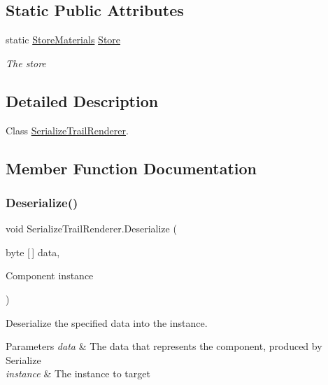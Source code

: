 \subsection*{Static Public Attributes}
\begin{DoxyCompactItemize}
\item 
static \hyperlink{class_serialization_1_1_store_materials}{Store\+Materials} \hyperlink{class_serialize_trail_renderer_a58675d32c691c906cc9deebc07f9a238}{Store}
\begin{DoxyCompactList}\small\item\em The store \end{DoxyCompactList}\end{DoxyCompactItemize}


\subsection{Detailed Description}
Class \hyperlink{class_serialize_trail_renderer}{Serialize\+Trail\+Renderer}. 



\subsection{Member Function Documentation}
\mbox{\label{class_serialize_trail_renderer_a9be87b05372daa6150e8e4522fa97568}} 
\subsubsection{\texorpdfstring{Deserialize()}{Deserialize()}}
{\footnotesize\ttfamily void Serialize\+Trail\+Renderer.\+Deserialize (\begin{DoxyParamCaption}\item[{byte \mbox{[}$\,$\mbox{]}}]{data,  }\item[{Component}]{instance }\end{DoxyParamCaption})\hspace{0.3cm}{\ttfamily [inline]}}



Deserialize the specified data into the instance. 


\begin{DoxyParams}{Parameters}
{\em data} & The data that represents the component, produced by Serialize\\
\hline
{\em instance} & The instance to target\\
\hline
\end{DoxyParams}


